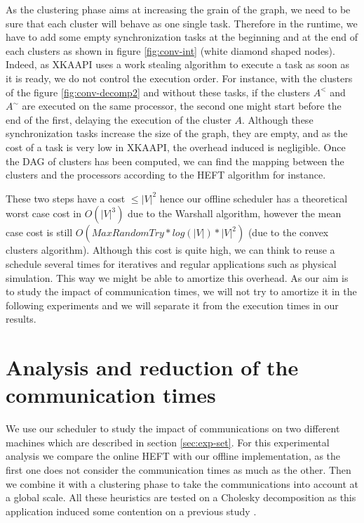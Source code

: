 \documentclass[10pt, conference, compsocconf,pdftex,dvipsnames]{IEEEtran}
\begin{document}
As the clustering phase aims at increasing the grain of the graph, we need to
be sure that each cluster will behave as one single task. Therefore in the
runtime, we have to add some empty synchronization tasks at the beginning and
at the end of each clusters as shown in figure \ref{fig:conv-int} (white
diamond shaped nodes).  Indeed, as XKAAPI uses a work stealing algorithm to
execute a task as soon as it is ready, we do not control the execution order.
For instance, with the clusters of the figure \ref{fig:conv-decomp2} and
without these tasks, if the clusters $A^<$ and $A^{\sim}$ are executed on the
same processor, the second one might start before the end of the first,
delaying the execution of the cluster $A$. Although these synchronization
tasks increase the size of the graph, they are empty, and as the cost of a
task is very low in XKAAPI, the overhead induced is negligible. Once the DAG
of clusters has been computed, we can find the mapping between the clusters
and the processors according to the HEFT algorithm for instance. 

These two steps have a cost $\leq |V|^2$ hence our offline scheduler has a
theoretical worst case cost in $O(|V|^3)$ due to the Warshall algorithm,
however the mean case cost is still $O(MaxRandomTry*log(|V|)*|V|^2)$ (due to
the convex clusters algorithm).  Although this cost is quite high, we can
think to reuse a schedule several times for iteratives and regular
applications such as physical simulation.  This way we might be able to
amortize this overhead. As our aim is to study the impact of communication
times, we will not try to amortize it in the following experiments and we will
separate it from the execution times in our results.

\section{Analysis and reduction of the communication times}
\label{sec:exp}

We use our scheduler to study the impact of communications on two different
machines which are described in section \ref{sec:exp-set}. For this
experimental analysis we compare the online HEFT with our offline implementation,
as the first one does not consider the communication times as much as the
other. Then we combine it with a clustering phase to take the communications
into account at a global scale. All these heuristics are tested on a
Cholesky decomposition as this application induced some contention on a
previous study \cite{ferreiralima:hal-00735470}.
\end{document}
